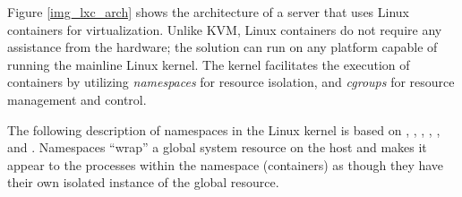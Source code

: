 Figure \ref{img_lxc_arch} shows the architecture of a server that uses Linux containers for virtualization. Unlike KVM, Linux containers do not require any assistance from the hardware; the solution can run on any platform capable of running the mainline Linux kernel. The kernel facilitates the execution of containers by utilizing \emph{namespaces} for resource isolation, and \emph{cgroups} for resource management and control. 


The following description of namespaces in the Linux kernel is based on \cite{namespaces1}, \cite{namespaces2}, \cite{namespaces3}, \cite{namespaces4}, \cite{namespaces5}, and \cite{namespaces6}.
Namespaces ``wrap'' a global system resource on the host and makes it appear to the processes within the namespace (containers) as though they have their own isolated instance of the global resource. 

